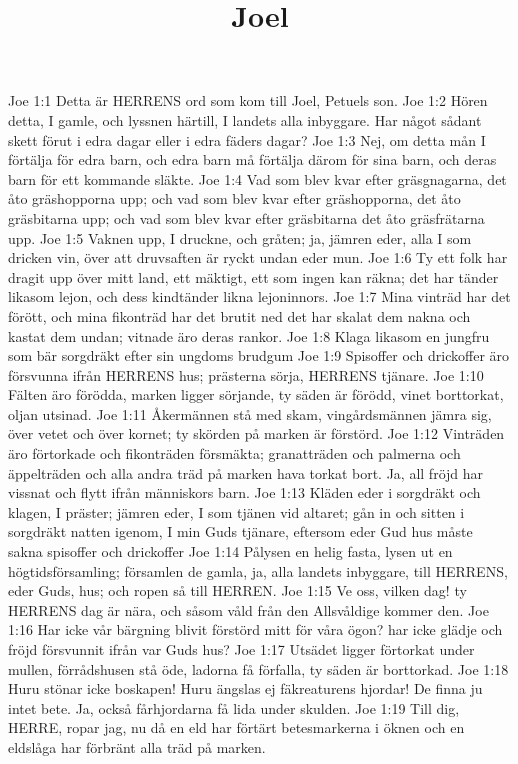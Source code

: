 

\title{Joel}

Joe 1:1  Detta är HERRENS ord som kom till Joel, Petuels son.
Joe 1:2  Hören detta, I gamle, och lyssnen härtill, I landets alla inbyggare. Har något sådant skett förut i edra dagar eller i edra fäders dagar?
Joe 1:3  Nej, om detta mån I förtälja för edra barn, och edra barn må förtälja därom för sina barn, och deras barn för ett kommande släkte.
Joe 1:4  Vad som blev kvar efter gräsgnagarna, det åto gräshopporna upp; och vad som blev kvar efter gräshopporna, det åto gräsbitarna upp; och vad som blev kvar efter gräsbitarna det åto gräsfrätarna upp.
Joe 1:5  Vaknen upp, I druckne, och gråten; ja, jämren eder, alla I som dricken vin, över att druvsaften är ryckt undan eder mun.
Joe 1:6  Ty ett folk har dragit upp över mitt land, ett mäktigt, ett som ingen kan räkna; det har tänder likasom lejon, och dess kindtänder likna lejoninnors.
Joe 1:7  Mina vinträd har det förött, och mina fikonträd har det brutit ned det har skalat dem nakna och kastat dem undan; vitnade äro deras rankor.
Joe 1:8  Klaga likasom en jungfru som bär sorgdräkt efter sin ungdoms brudgum
Joe 1:9  Spisoffer och drickoffer äro försvunna ifrån HERRENS hus; prästerna sörja, HERRENS tjänare.
Joe 1:10  Fälten äro förödda, marken ligger sörjande, ty säden är förödd, vinet borttorkat, oljan utsinad.
Joe 1:11  Åkermännen stå med skam, vingårdsmännen jämra sig, över vetet och över kornet; ty skörden på marken är förstörd.
Joe 1:12  Vinträden äro förtorkade och fikonträden försmäkta; granatträden och palmerna och äppelträden och alla andra träd på marken hava torkat bort. Ja, all fröjd har vissnat och flytt ifrån människors barn.
Joe 1:13  Kläden eder i sorgdräkt och klagen, I präster; jämren eder, I som tjänen vid altaret; gån in och sitten i sorgdräkt natten igenom, I min Guds tjänare, eftersom eder Gud hus måste sakna spisoffer och drickoffer
Joe 1:14  Pålysen en helig fasta, lysen ut en högtidsförsamling; församlen de gamla, ja, alla landets inbyggare, till HERRENS, eder Guds, hus; och ropen så till HERREN.
Joe 1:15  Ve oss, vilken dag! ty HERRENS dag är nära, och såsom våld från den Allsvåldige kommer den.
Joe 1:16  Har icke vår bärgning blivit förstörd mitt för våra ögon? har icke glädje och fröjd försvunnit ifrån var Guds hus?
Joe 1:17  Utsädet ligger förtorkat under mullen, förrådshusen stå öde, ladorna få förfalla, ty säden är borttorkad.
Joe 1:18  Huru stönar icke boskapen! Huru ängslas ej fäkreaturens hjordar! De finna ju intet bete. Ja, också fårhjordarna få lida under skulden.
Joe 1:19  Till dig, HERRE, ropar jag, nu då en eld har förtärt betesmarkerna i öknen och en eldslåga har förbränt alla träd på marken.
